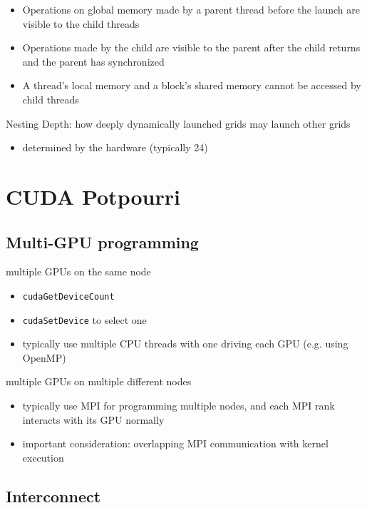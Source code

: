 \documentclass{article}
\begin{document}
\begin{itemize}
\item Operations on global memory made by a parent thread before the launch are visible to the child threads
\item Operations made by the child are visible to the parent after the child returns and the parent has synchronized
\item A thread's local memory and a block's shared memory cannot be accessed by child threads

\end{itemize}
Nesting Depth: how deeply dynamically launched grids may launch other grids

\begin{itemize}
\item determined by the hardware (typically 24)





\end{itemize}

\section{CUDA Potpourri}

\subsection{Multi-GPU programming}

multiple GPUs on the same node

\begin{itemize}
\item \texttt{cudaGetDeviceCount}
\item \texttt{cudaSetDevice} to select one
\item typically use multiple CPU threads with one driving each GPU (e.g. using OpenMP)

\end{itemize}
multiple GPUs on multiple different nodes

\begin{itemize}
\item typically use MPI for programming multiple nodes, and each MPI rank interacts with its GPU normally
\item important consideration: overlapping MPI communication with kernel execution

\end{itemize}
\subsection{Interconnect}
\end{document}
